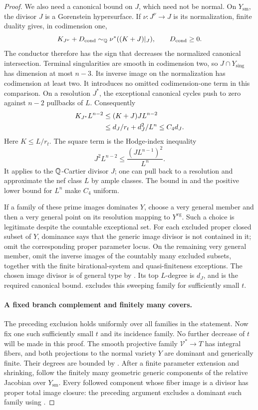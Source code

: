 \begin{proof}
We also need a canonical bound on \(J\), which need not be normal.
On \(Y_{\mathrm{sm}}\), the divisor \(J\) is a Gorenstein
hypersurface. If \(\nu:J^\nu\to J\) is its normalization, finite
duality gives, in codimension one,
\[
 K_{J^\nu}+D_{\mathrm{cond}}
 \sim_{\mathbb Q}\nu^*((K+J)|_J),\qquad D_{\mathrm{cond}}\ge0 .
\]
The conductor therefore has the sign that decreases the
normalized canonical intersection. Terminal singularities are
smooth in codimension two, so \(J\cap Y_{\mathrm{sing}}\) has
dimension at most \(n-3\). Its inverse image on the normalization
has codimension at least two. It introduces no omitted
codimension-one term in this comparison. On a resolution \(J^*\),
the exceptional canonical cycles push to zero against \(n-2\)
pullbacks of \(L\). Consequently
\begin{align}
 K_{J^*}L^{n-2}
 &\le (K+J)J L^{n-2} \notag\\
 &\le d_J/r_t+d_J^2/L^n
 \le C_4d_J .
 \label{eq:branch-canonical}
\end{align}
Here \(K\le L/r_t\). The square term is the Hodge-index inequality
\[
 J^2L^{n-2}\le\frac{(JL^{n-1})^2}{L^n}.
\]
It applies to the \(\mathbb Q\)-Cartier divisor \(J\); one can pull back
to a resolution and approximate the nef class \(L\) by ample
classes. The bound in  and the positive lower
bound for \(L^n\) make \(C_4\) uniform.

If a family of these prime images dominates \(Y\), choose a very
general member and then a very general point on its resolution
mapping to \(Y^{\mathrm{vg}}\). Such a choice is legitimate despite
the countable exceptional set. For each excluded proper closed
subset of \(Y\), dominance says that the generic image divisor is
not contained in it; omit the corresponding proper parameter
locus. On the remaining very general member, omit the inverse
images of the countably many excluded subsets, together with the
finite birational-system and quasi-finiteness exceptions.
The chosen image divisor is of general type by
. Its top \(L\)-degree is \(d_J\), and
 is the required canonical bound.
 excludes this sweeping family for
sufficiently small \(t\).

\paragraph{A fixed branch complement and finitely many covers.}
The preceding exclusion holds uniformly over all families in the
statement. Now fix one such sufficiently small \(t\) and its incidence
family. No further decrease of \(t\) will be made in this proof.
The smooth projective family
\(\mathcal V^*\to T\) has integral fibers, and both projections
to the normal variety \(Y\) are dominant and generically finite.
Their degrees are bounded by .
After a finite parameter extension and shrinking, follow the
finitely many geometric generic components of the relative
Jacobian over \(Y_{\mathrm{sm}}\). Every followed component whose
fiber image is a divisor has proper total image closure: the
preceding argument excludes a dominant such family using
.


\end{proof}
